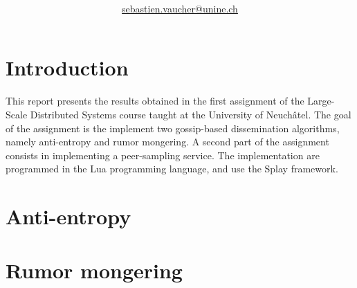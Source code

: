 \documentclass[11pt,a4paper]{scrartcl}
\author{\myauthor\\ \href{mailto:sebastien.vaucher@unine.ch}{sebastien.vaucher@unine.ch}}
\title{\huge \textbf{\mytitle}}
\begin{document}
\nocite{*}

\begin{titlingpage}

\begin{otherlanguage}{australian}
\maketitle
\end{otherlanguage}

\setcounter{tocdepth}{1}
\tableofcontents

\begin{figure}[b]
\centering
{}
\qquad
{}
\end{figure}

\end{titlingpage}

\pagebreak

\section{Introduction}

This report presents the results obtained in the first assignment of the Large-Scale Distributed Systems course taught at the University of Neuchâtel. The goal of the assignment is the implement two gossip-based dissemination algorithms, namely anti-entropy and rumor mongering. A second part of the assignment consists in implementing a peer-sampling service. The implementation are programmed in the Lua programming language, and use the Splay framework.

\section{Anti-entropy}

\section{Rumor mongering}
\end{document}
